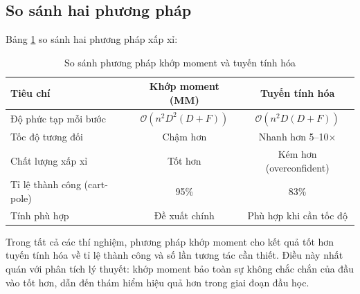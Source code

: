 \subsection{So sánh hai phương pháp}
\label{SUB_SEC_mm_vs_lin}

Bảng \ref{TAB_mm_vs_lin} so sánh hai phương pháp xấp xỉ:

\begin{table}[h!]
\centering
\caption{So sánh phương pháp khớp moment và tuyến tính hóa}
\label{TAB_mm_vs_lin}
\begin{tabular}{|l|c|c|}
\hline
\textbf{Tiêu chí} & \textbf{Khớp moment (MM)} & \textbf{Tuyến tính hóa} \\\hline
Độ phức tạp mỗi bước & $\mathcal{O}(n^2 D^2(D+F))$ & $\mathcal{O}(n^2 D(D+F))$ \\\hline
Tốc độ tương đối & Chậm hơn & Nhanh hơn 5--10$\times$ \\\hline
Chất lượng xấp xỉ & Tốt hơn & Kém hơn (overconfident) \\\hline
Tỉ lệ thành công (cart-pole) & 95\% & 83\% \\\hline
Tính phù hợp & Đề xuất chính & Phù hợp khi cần tốc độ \\\hline
\end{tabular}
\end{table}

\begin{nx}
    Trong tất cả các thí nghiệm, phương pháp khớp moment cho kết quả tốt hơn tuyến tính hóa về tỉ lệ thành công và số lần tương tác cần thiết. Điều này nhất quán với phân tích lý thuyết: khớp moment bảo toàn sự không chắc chắn của đầu vào tốt hơn, dẫn đến thám hiểm hiệu quả hơn trong giai đoạn đầu học.
\end{nx}
\medskip
